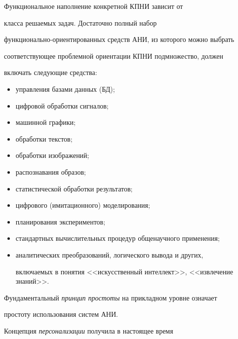 Функциональное наполнение конкретной КПНИ зависит от


класса решаемых задач. Достаточно полный  набор


функ\-ци\-о\-наль\-но-ориенти\-ро\-ван\-ных средств АНИ, из которого можно выбрать


соответствующее проблемной ориентации КПНИ подмножество, должен


включать следующие средства:


\begin{itemize}


\item  управления базами данных (БД);


\item  цифровой обработки сигналов;


\item  машинной графики;


\item  обработки текстов;


\item  обработки изображений;


\item  распознавания образов;


\item  статистической обработки результатов;


\item  цифрового (имитационного) моделирования;


\item  планирования экспериментов;


\item  стандартных вычислительных процедур общенаучного применения;


\item  аналитических преобразований, логического вывода и других,


включаемых в понятия <<искусственный интеллект>>, <<извлечение знаний>>.


\end{itemize}





Фундаментальный \textit{принцип простоты} на прикладном уровне означает


прос\-то\-ту использования систем АНИ.





Концепция \textit{персонализации} получила в настоящее время


